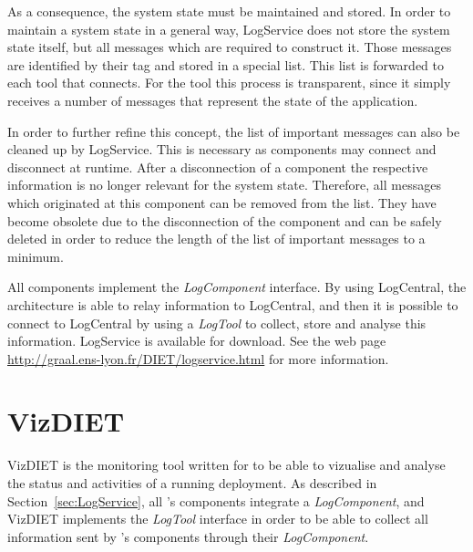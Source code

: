 \begin{description}
    As a consequence, the system state must be maintained and stored.  In order
    to maintain a system state in a general way, LogService does not store the
    system state itself, but all messages which are required to construct it.
    Those messages are identified by their tag and stored in a special list.
    This list is forwarded to each tool that connects.  For the tool this
    process is transparent, since it simply receives a number of messages that
    represent the state of the application.
    \label{ref:LogService_system_stats}

    In order to further refine this concept, the list of important messages can
    also be cleaned up by LogService. This is necessary as components may
    connect and disconnect at runtime. After a disconnection of a component the
    respective information is no longer relevant for the system state.
    Therefore, all messages which originated at this component can be removed
    from the list.  They have become obsolete due to the disconnection of the
    component and can be safely deleted in order to reduce the length of the
    list of important messages to a minimum.
    \end{description}

All \diet components implement the \textit{LogComponent} interface. By using
LogCentral, the \diet architecture is able to relay information to LogCentral,
and then it is possible to connect to LogCentral by using a \textit{LogTool} to
collect, store and analyse this information. LogService is available for
download. See the web page \url{http://graal.ens-lyon.fr/DIET/logservice.html}
for more information.

\section{VizDIET}
\label{sec:VizDIET}
VizDIET is the monitoring tool written for \diet to be able to vizualise and
analyse the status and activities of a running \diet deployment. As described
in Section~\ref{sec:LogService}, all \diet's components integrate a
\textit{LogComponent}, and VizDIET implements the \textit{LogTool} interface in
order to be able to collect all information sent by \diet's components through
their \textit{LogComponent}.

